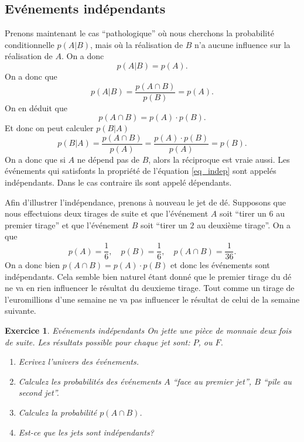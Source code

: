 \documentclass[a4paper,12pt]{book}
\newtheorem*{exercice}{Exercice}
\begin{document}
\subsection{Evénements indépendants}

Prenons maintenant le cas ``pathologique'' où nous cherchons la probabilité conditionnelle $p(A|B)$, mais où 
la réalisation de $B$ n'a aucune influence sur la réalisation de $A$. On a donc 
\begin{equation}
 p(A|B)=p(A).
\end{equation}
On a donc que 
\begin{equation}
 p(A|B)=\frac{p(A\cap B)}{p(B)}=p(A).
\end{equation}
On en déduit que 
\begin{equation}
p(A\cap B)=p(A)\cdot p(B).\label{eq_indep}
\end{equation}
Et donc on peut calculer $p(B|A)$
\begin{equation}
p(B|A)=\frac{p(A\cap B)}{p(A)}=\frac{p(A)\cdot p(B)}{p(A)}=p(B).
\end{equation}
On a donc que si $A$ ne dépend pas de $B$, alors la réciproque est vraie aussi.
Les événements qui satisfonts la propriété de l'équation \eqref{eq_indep} sont appelés
indépendants. Dans le cas contraire ils sont appelé dépendants.

Afin d'illustrer l'indépendance, prenons à nouveau le jet de dé. Supposons que nous effectuions
deux tirages de suite et que l'événement $A$ soit ``tirer un 6 au premier tirage'' et que l'événement $B$
soit ``tirer un $2$ au deuxième tirage''. On a que 
\begin{equation}
 p(A)=\frac{1}{6},\quad p(B)=\frac{1}{6},\quad p(A\cap B)=\frac{1}{36}.
\end{equation}
On a donc bien $p(A\cap B)=p(A)\cdot p(B)$ et donc les événements sont indépendants. 
Cela semble bien naturel étant donné que le premier tirage du dé ne va en rien influencer le résultat du deuxieme 
tirage. Tout comme un tirage de l'euromillions d'une semaine ne va pas influencer le résultat de celui de la semaine suivante.

\begin{exercice}{Evénements indépendants}
On jette une pièce de monnaie deux fois de suite. Les résultats possible pour chaque jet sont: $P$, ou $F$.
\begin{enumerate}
 \item Ecrivez l'univers des événements.
 \item Calculez les probabilités des événements $A$ ``face au premier jet'', $B$ ``pile au second jet''.
 \item Calculez la probabilité $p(A\cap B)$. 
 \item Est-ce que les jets sont indépendants?
\end{enumerate}
\end{exercice}
\end{document}

